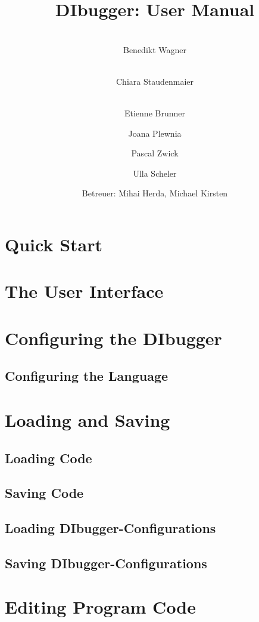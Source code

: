 \documentclass[parskip=full]{memoir}
\title{
	\vspace{2cm}
	\myfont 
	DIbugger: User Manual\\
}
\author{
	\vspace{1cm} \\
	Benedikt Wagner\\
	\and
	\vspace{1cm} \\ Chiara Staudenmaier\\
	\and 
		\vspace{1cm} \\
		Etienne Brunner\\
	\and Joana Plewnia\\
	\and Pascal Zwick\\
	\and Ulla Scheler\\
	\vspace{1cm}
	\and Betreuer: Mihai Herda, Michael Kirsten
	\vspace{4cm}
}
\begin{document}
\clearpage
\maketitle
{}
\newpage

\tableofcontents
\newpage
{}

\chapter{Quick Start} %
\chapter{The User Interface} %

\chapter{Configuring the DIbugger} %
\section{Configuring the Language}

\chapter{Loading and Saving} %
\section{Loading Code}
\section{Saving Code}
\section{Loading DIbugger-Configurations}
\section{Saving DIbugger-Configurations}

\chapter{Editing Program Code} %
\end{document}
